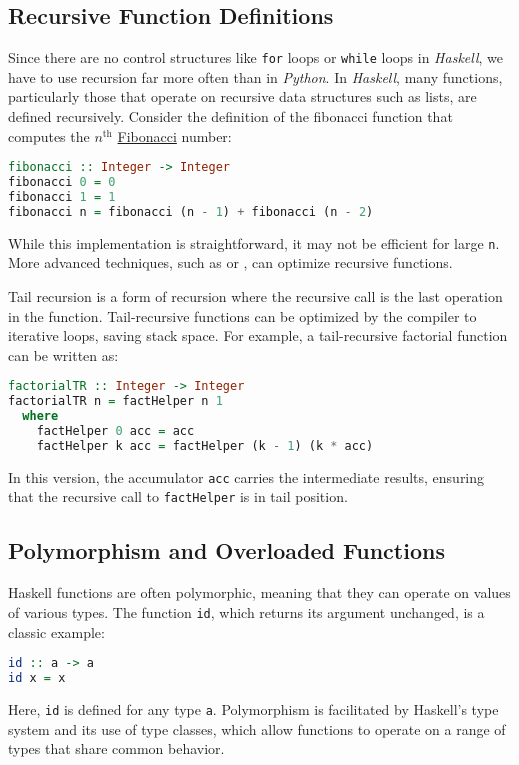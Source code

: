 \subsection{Recursive Function Definitions}
Since there are no control structures like \texttt{for} loops or \texttt{while} loops in \textsl{Haskell}, we
have to use recursion far more often than in \textsl{Python}.
In \textsl{Haskell}, many functions, particularly those that operate on recursive data structures such as
lists, are defined recursively.  Consider the definition of the fibonacci function that computes the $n^{\textrm{th}}$
\href{https://en.wikipedia.org/wiki/Fibonacci_sequence}{Fibonacci} number: 
\begin{lstlisting}[style=haskellstyle, language=Haskell]
fibonacci :: Integer -> Integer
fibonacci 0 = 0
fibonacci 1 = 1
fibonacci n = fibonacci (n - 1) + fibonacci (n - 2)
\end{lstlisting}
While this implementation is straightforward, it may not be efficient for large \texttt{n}. More advanced
techniques, such as  or , can optimize recursive functions. 

Tail recursion is a form of recursion where the recursive call is the last operation in the function. Tail-recursive functions can be optimized by the compiler to iterative loops, saving stack space. For example, a tail-recursive factorial function can be written as:
\begin{lstlisting}[style=haskellstyle, language=Haskell]
factorialTR :: Integer -> Integer
factorialTR n = factHelper n 1
  where
    factHelper 0 acc = acc
    factHelper k acc = factHelper (k - 1) (k * acc)
\end{lstlisting}
In this version, the accumulator \texttt{acc} carries the intermediate results, ensuring that the recursive call to \texttt{factHelper} is in tail position.

\subsection{Polymorphism and Overloaded Functions}

Haskell functions are often polymorphic, meaning that they can operate on values of various types. The function \texttt{id}, which returns its argument unchanged, is a classic example:
\begin{lstlisting}[style=haskellstyle, language=Haskell]
id :: a -> a
id x = x
\end{lstlisting}
Here, \texttt{id} is defined for any type \texttt{a}. Polymorphism is facilitated by Haskell’s type system and its use of type classes, which allow functions to operate on a range of types that share common behavior.

